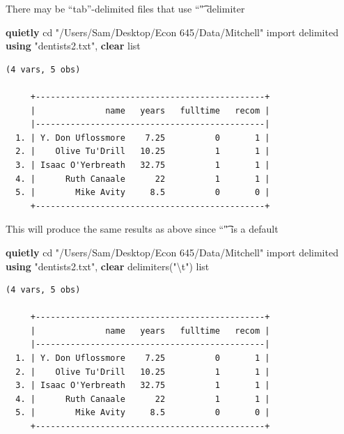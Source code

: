 \documentclass[
]{book}
\newenvironment{Shaded}{\begin{snugshade}}{\end{snugshade}}
\newcommand{\CharTok}[1]{\textcolor[rgb]{0.31,0.60,0.02}{#1}}
\newcommand{\KeywordTok}[1]{\textcolor[rgb]{0.13,0.29,0.53}{\textbf{#1}}}
\newcommand{\NormalTok}[1]{#1}
\newcommand{\OtherTok}[1]{\textcolor[rgb]{0.56,0.35,0.01}{#1}}
\newcommand{\StringTok}[1]{\textcolor[rgb]{0.31,0.60,0.02}{#1}}
\begin{document}
There may be ``tab''-delimited files that use ``\t" delimiter

\begin{Shaded}
\begin{Highlighting}[]
\KeywordTok{quietly}\NormalTok{ cd }\StringTok{"/Users/Sam/Desktop/Econ 645/Data/Mitchell"}
\NormalTok{import delimited }\KeywordTok{using} \StringTok{"dentists2.txt"}\NormalTok{, }\KeywordTok{clear}
\OtherTok{list}
\end{Highlighting}
\end{Shaded}

\begin{verbatim}
(4 vars, 5 obs)

     +----------------------------------------------+
     |              name   years   fulltime   recom |
     |----------------------------------------------|
  1. | Y. Don Uflossmore    7.25          0       1 |
  2. |    Olive Tu'Drill   10.25          1       1 |
  3. | Isaac O'Yerbreath   32.75          1       1 |
  4. |      Ruth Canaale      22          1       1 |
  5. |        Mike Avity     8.5          0       0 |
     +----------------------------------------------+
\end{verbatim}

This will produce the same results as above since ``\t" is a default

\begin{Shaded}
\begin{Highlighting}[]
\KeywordTok{quietly}\NormalTok{ cd }\StringTok{"/Users/Sam/Desktop/Econ 645/Data/Mitchell"}
\NormalTok{import delimited }\KeywordTok{using} \StringTok{"dentists2.txt"}\NormalTok{, }\KeywordTok{clear}\NormalTok{ delimiters(}\StringTok{"}\CharTok{\textbackslash{}t}\StringTok{"}\NormalTok{)}
\OtherTok{list}
\end{Highlighting}
\end{Shaded}

\begin{verbatim}
(4 vars, 5 obs)

     +----------------------------------------------+
     |              name   years   fulltime   recom |
     |----------------------------------------------|
  1. | Y. Don Uflossmore    7.25          0       1 |
  2. |    Olive Tu'Drill   10.25          1       1 |
  3. | Isaac O'Yerbreath   32.75          1       1 |
  4. |      Ruth Canaale      22          1       1 |
  5. |        Mike Avity     8.5          0       0 |
     +----------------------------------------------+
\end{verbatim}
\end{document}

